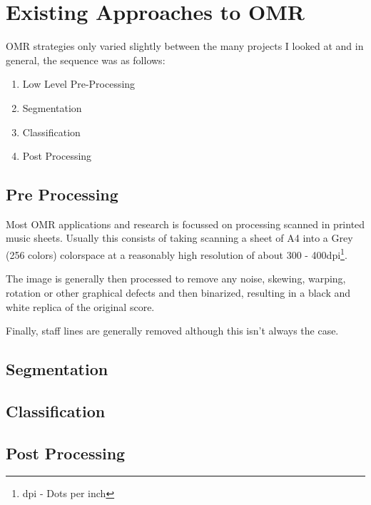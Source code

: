 \section{Existing Approaches to OMR}

OMR strategies only varied slightly between the many projects I looked at and in general, the sequence was as follows:

\begin{enumerate}
\item Low Level Pre-Processing
\item Segmentation
\item Classification
\item Post Processing
\end{enumerate}

\subsection{Pre Processing}
Most OMR applications and research is focussed on processing scanned in printed music sheets. Usually this consists of taking scanning a sheet of A4 into a Grey (256 colors) colorspace at a reasonably high resolution of about 300 - 400dpi\footnote{dpi - Dots per inch}.

The image is generally then processed to remove any noise, skewing, warping, rotation or other graphical defects and then binarized, resulting in a black and white replica of the original score.

Finally, staff lines are generally removed  although this isn't always the case.

\subsection{Segmentation}
\subsection{Classification}
\subsection{Post Processing}
